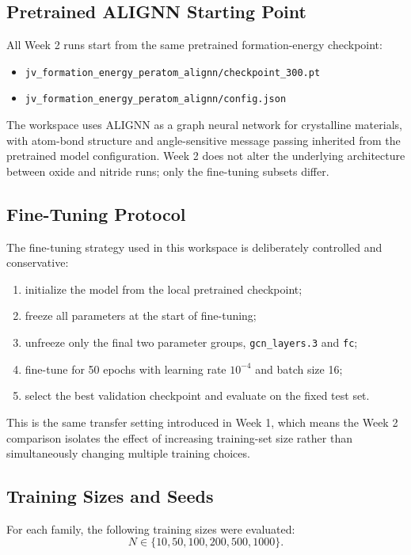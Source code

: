 \documentclass[11pt]{article}
\begin{document}
\subsection{Pretrained ALIGNN Starting Point}
All Week 2 runs start from the same pretrained formation-energy checkpoint:
\begin{itemize}
  \item \texttt{jv\_formation\_energy\_peratom\_alignn/checkpoint\_300.pt}
  \item \texttt{jv\_formation\_energy\_peratom\_alignn/config.json}
\end{itemize}

The workspace uses ALIGNN as a graph neural network for crystalline materials, with atom-bond structure and angle-sensitive message passing inherited from the pretrained model configuration.
Week 2 does not alter the underlying architecture between oxide and nitride runs; only the fine-tuning subsets differ.

\subsection{Fine-Tuning Protocol}
The fine-tuning strategy used in this workspace is deliberately controlled and conservative:
\begin{enumerate}
  \item initialize the model from the local pretrained checkpoint;
  \item freeze all parameters at the start of fine-tuning;
  \item unfreeze only the final two parameter groups, \texttt{gcn\_layers.3} and \texttt{fc};
  \item fine-tune for 50 epochs with learning rate $10^{-4}$ and batch size 16;
  \item select the best validation checkpoint and evaluate on the fixed test set.
\end{enumerate}

This is the same transfer setting introduced in Week 1, which means the Week 2 comparison isolates the effect of increasing training-set size rather than simultaneously changing multiple training choices.

\subsection{Training Sizes and Seeds}
For each family, the following training sizes were evaluated:
\[
N \in \{10, 50, 100, 200, 500, 1000\}.
\]
\end{document}
